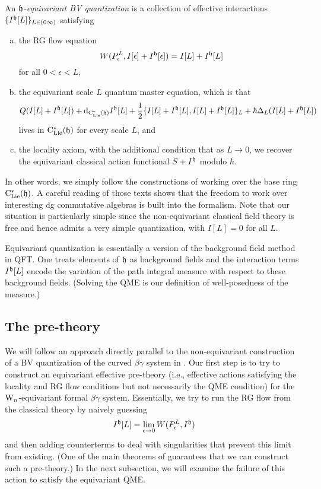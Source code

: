 \begin{dfn} \label{eqQFT} 
An {\em $\mathfrak h$-equivariant BV quantization} is a collection of effective interactions $\{I^\mathfrak h[L]\}_{L \in (0\infty)}$
satisfying
\begin{enumerate}[(a)]
\item the RG flow equation
\[
W(P_\epsilon^L, I[\epsilon]+I^\mathfrak h[\epsilon]) = I[L] + I^\mathfrak h[L]
\]
for all $0 < \epsilon < L$,
\item the equivariant scale $L$ quantum master equation, which is that
\[
Q(I[L]+I^\mathfrak h[L]) + {\rm d}_{{\rm C}_{\rm Lie}^*(\mathfrak h)} I^\mathfrak h[L] + \frac{1}{2}\{I[L]+I^\mathfrak h[L],I[L]+I^\mathfrak h[L]\}_{L} + \hbar \Delta_L(I[L]+I^\mathfrak h[L])
\]
lives in ${\rm C}_{\rm Lie}^*(\mathfrak h)$ for every scale $L$, and
\item the locality axiom, with the additional condition that as $L \to 0$, we recover the equivariant classical action functional $S+ I^\mathfrak h$ modulo $\hbar$.
\end{enumerate}
\end{dfn}

In other words, we simply follow the constructions of \cite{CosBook,CG} working over the base ring ${\rm C}_{\rm Lie}^*(\mathfrak h)$.
A careful reading of those texts shows that the freedom to work over interesting dg commutative algebras is built into the formalism.
Note that our situation is particularly simple since the non-equivariant classical field theory is free and hence admits a very simple quantization,
with $I[L] = 0$ for all $L$.

\begin{rmk}
Equivariant quantization is essentially a version of the background field method in QFT.
One treats elements of $\mathfrak h$ as background fields and 
the interaction terms $I^\mathfrak h[L]$ encode the variation of the path integral measure with respect to these background fields.
(Solving the QME is our definition of well-posedness of the measure.)
\end{rmk}

\subsection{The pre-theory}
\label{sec prequant}

We will follow an approach directly parallel to the non-equivariant construction of a BV quantization of the curved $\beta\gamma$ system in \cite{WG2}.
Our first step is to try to construct an equivariant effective pre-theory 
(i.e., effective actions satisfying the locality and RG flow conditions but not necessarily the QME condition)
for the ${{\rm W}_n}$-equivariant formal $\beta\gamma$ system.
Essentially, we try to run the RG flow from the classical theory by naively guessing
\[
I^\mathfrak h[L] = \lim_{\epsilon \to 0} W(P^L_\epsilon,I^\mathfrak h)
\]
and then adding counterterms to deal with singularities that prevent this limit from existing.
(One of the main theorems of \cite{CosBook} guarantees that we can construct such a pre-theory.)
In the next subsection, we will examine the failure of this action to satisfy the equivariant QME.

